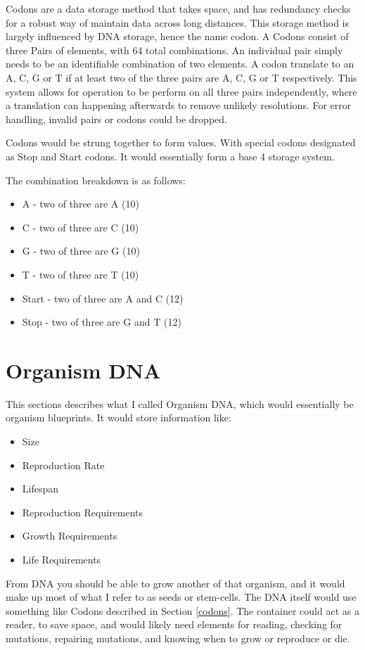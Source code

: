 \documentclass[article,12pt,oneside]{memoir}
\begin{document}
Codons are a data storage method that takes space, and has redundancy checks for a robust way of maintain data across long distances.
This storage method is largely influenced by DNA storage, hence the name codon.
A Codons consist of three Pairs of elements, with 64 total combinations.
An individual pair simply needs to be an identifiable combination of two elements.
A codon translate to an A, C, G or T if at least two of the three pairs are A, C, G or T respectively.
This system allows for operation to be perform on all three pairs independently, where a translation can happening afterwards to remove unlikely resolutions.
For error handling, invalid pairs or codons could be dropped.

Codons would be strung together to form values. With special codons designated as Stop and Start codons.
It would essentially form a base 4 storage system.

The combination breakdown is as follows:
\begin{itemize}
	\item A - two of three are A (10)
	\item C - two of three are C (10)
	\item G - two of three are G (10)
	\item T - two of three are T (10)
	\item Start - two of three are A and C (12)
	\item Stop - two of three are G and T (12)
\end{itemize}


\section{Organism DNA}

This sections describes what I called Organism DNA, which would essentially be organism blueprints.
It would store information like:

\begin{itemize}
	\item Size
	\item Reproduction Rate
	\item Lifespan
	\item Reproduction Requirements
	\item Growth Requirements
	\item Life Requirements
\end{itemize}

From DNA you should be able to grow another of that organism, and it would make up most of what I refer to as seeds or stem-cells.
The DNA itself would use something like Codons described in Section \ref{codons}.
The container could act as a reader, to save space, and would likely need elements for reading, checking for mutations, repairing mutations, and knowing when to grow or reproduce or die.
\end{document}
